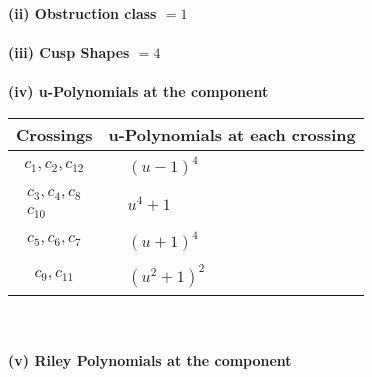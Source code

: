 \documentclass[1p]{elsarticle_modified}
\theoremstyle{definition}
\begin{document}
\flushleft \textbf{(ii) Obstruction class $= 1$}\\~\\
\flushleft \textbf{(iii) Cusp Shapes $= 4$}\\~\\
\newpage\renewcommand{\arraystretch}{1}
\flushleft \textbf{(iv) u-Polynomials at the component}\newline \\
\begin{tabular}{m{50pt}|m{274pt}}
Crossings & \hspace{64pt}u-Polynomials at each crossing \\
\hline $$\begin{aligned}c_{1},c_{2},c_{12}\end{aligned}$$&$\begin{aligned}
&(u-1)^4
\end{aligned}$\\
\hline $$\begin{aligned}c_{3},c_{4},c_{8}\\c_{10}\end{aligned}$$&$\begin{aligned}
&u^4+1
\end{aligned}$\\
\hline $$\begin{aligned}c_{5},c_{6},c_{7}\end{aligned}$$&$\begin{aligned}
&(u+1)^4
\end{aligned}$\\
\hline $$\begin{aligned}c_{9},c_{11}\end{aligned}$$&$\begin{aligned}
&(u^2+1)^2
\end{aligned}$\\
\hline
\end{tabular}\\~\\
\newpage\renewcommand{\arraystretch}{1}
\flushleft \textbf{(v) Riley Polynomials at the component}\newline \\
\end{document}
